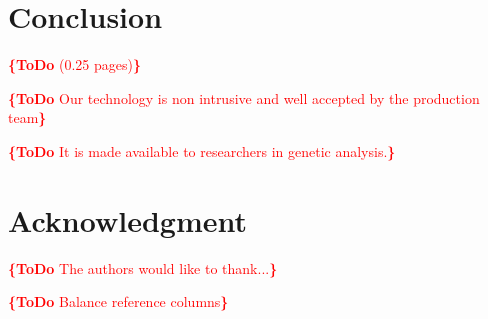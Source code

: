\documentclass[conference]{IEEEtran}
\newcommand{\todo}[1]{\noindent\textcolor{red}{{\bf \{ToDo} #1{\bf \}}}}
\begin{document}
\section{Conclusion}
\todo{(0.25 pages)}

\todo{Our technology is non intrusive and well accepted by the production team}

\todo{It is made available to researchers in genetic analysis.}

 

\section*{Acknowledgment}

\todo{The authors would like to thank...}

\todo{Balance reference columns}







\end{document}
